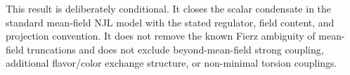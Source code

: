 \documentclass[aps,prd,twocolumn,superscriptaddress,preprintnumbers,nofootinbib,longbibliography,floatfix]{revtex4-2}
\begin{document}
This result is deliberately conditional.  It closes the scalar condensate in
the standard mean-field NJL model with the stated regulator, field content,
and projection convention.  It does not remove the known Fierz ambiguity of
mean-field truncations and does not exclude beyond-mean-field strong coupling,
additional flavor/color exchange structure, or non-minimal torsion couplings.

\end{document}
